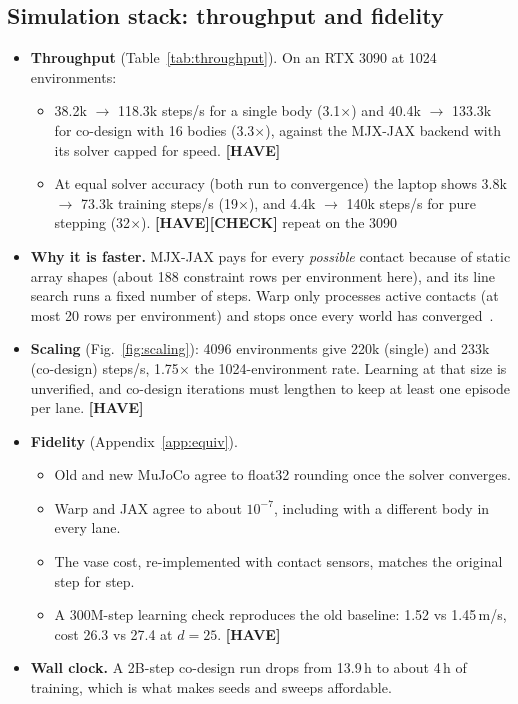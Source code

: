 \documentclass[sigconf,review]{acmart}
\newcommand{\statustag}[2]{\textcolor{#1}{\textsf{\scriptsize\bfseries[#2]}}}
\newcommand{\HAVE}{\statustag{teal!70!black}{HAVE}\hspace{0.3em}}
\newcommand{\CHECK}{\statustag{orange!85!black}{CHECK}\hspace{0.3em}}
\begin{document}
\subsection{Simulation stack: throughput and fidelity}
\label{sec:res-sim}
\begin{itemize}
\item \textbf{Throughput} (Table~\ref{tab:throughput}). On an RTX 3090 at 1024 environments:
  \begin{itemize}
  \item 38.2k $\to$ 118.3k steps/s for a single body (3.1$\times$) and 40.4k $\to$ 133.3k for co-design with 16 bodies (3.3$\times$), against the MJX-JAX backend with its solver capped for speed. \HAVE
  \item At equal solver accuracy (both run to convergence) the laptop shows 3.8k $\to$ 73.3k training steps/s (19$\times$), and 4.4k $\to$ 140k steps/s for pure stepping (32$\times$). \HAVE \CHECK{} repeat on the 3090
  \end{itemize}
\item \textbf{Why it is faster.} MJX-JAX pays for every \emph{possible} contact because of static array shapes (about 188 constraint rows per environment here), and its line search runs a fixed number of steps. Warp only processes active contacts (at most 20 rows per environment) and stops once every world has converged~\cite{zakka2025playground,mujocowarp2025}.
\item \textbf{Scaling} (Fig.~\ref{fig:scaling}): 4096 environments give 220k (single) and 233k (co-design) steps/s, 1.75$\times$ the 1024-environment rate. Learning at that size is unverified, and co-design iterations must lengthen to keep at least one episode per lane. \HAVE
\item \textbf{Fidelity} (Appendix~\ref{app:equiv}).
  \begin{itemize}
  \item Old and new MuJoCo agree to float32 rounding once the solver converges.
  \item Warp and JAX agree to about $10^{-7}$, including with a different body in every lane.
  \item The vase cost, re-implemented with contact sensors, matches the original step for step.
  \item A 300M-step learning check reproduces the old baseline: 1.52 vs 1.45\,m/s, cost 26.3 vs 27.4 at $d = 25$. \HAVE
  \end{itemize}
\item \textbf{Wall clock.} A 2B-step co-design run drops from 13.9\,h to about 4\,h of training, which is what makes seeds and sweeps affordable.

\end{itemize}
\end{document}
